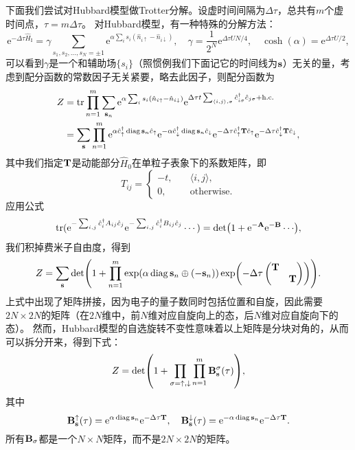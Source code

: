 \documentclass[hyperref, UTF8, a4paper]{ctexart}
\DeclareMathOperator{\diag}{diag}
\newcommand*{\ee}{\mathrm{e}}
\newcommand*{\pair}[1]{\langle #1 \rangle}
\begin{document}
下面我们尝试对Hubbard模型做Trotter分解。设虚时间间隔为$\Delta\tau$，总共有$m$个虚时间点，$\tau=m\Delta \tau$。
对Hubbard模型，有一种特殊的分解方法：
\begin{equation}
    \ee^{-\Delta \tau \hat{H}_\text{I}} = \gamma \sum_{s_1, s_2, \ldots, s_N = \pm 1} \ee^{\alpha \sum_i s_i (\hat{n}_{i\uparrow} - \hat{n}_{i \downarrow})}, 
    \quad \gamma = \frac{1}{2^N} \ee^{\Delta \tau U N / 4}, \quad \cosh(\alpha) = \ee^{\Delta \tau U / 2},
\end{equation}
可以看到$\gamma$是一个和辅助场$\{s_i\}$（照惯例我们下面记它的时间线为$\vb{s}$）无关的量，考虑到配分函数的常数因子无关紧要，略去此因子，则配分函数为
\[
    \begin{aligned}
        Z &= \trace \prod_{n=1}^m \sum_{\vb{s}_{n}} \ee^{\alpha \sum_i s_i (\hat{n}_{i\uparrow} - \hat{n}_{i \downarrow})} \ee^{\Delta \tau t \sum_{\pair{i, j}, \sigma} \hat{c}_{i\sigma}^\dagger \hat{c}_{j\sigma} + \text{h.c.}} \\
        &= \sum_{\vb{s}} \prod_{n=1}^m \ee^{\alpha \hat{c}^\dagger_{\uparrow} \diag{\vb{s}_n} \hat{c}_{\uparrow}} \ee^{- \alpha \hat{c}^\dagger_{\downarrow} \diag{\vb{s}_n} \hat{c}_{\downarrow}} \ee^{- \Delta \tau \hat{c}_\uparrow^\dagger \vb{T} \hat{c}_\uparrow} \ee^{- \Delta \tau \hat{c}_\downarrow^\dagger \vb{T} \hat{c}_\downarrow},
    \end{aligned}
\]
其中我们指定$\vb{T}$是动能部分$\hat{H}_0$在单粒子表象下的系数矩阵，即
\begin{equation}
    T_{ij} = \begin{cases}
        -t, \quad &\pair{i, j}, \\
        0, \quad &\text{otherwise}.
    \end{cases}
\end{equation}
应用公式
\begin{equation}
    \trace(\ee^{- \sum_{i, j} \hat{c}_i^\dagger A_{ij} \hat{c}_j} \ee^{- \sum_{i, j} \hat{c}_i^\dagger B_{ij} \hat{c}_j} \cdots) = \det(1 + \ee^{- \vb{A}}\ee^{- \vb{B}} \cdots),
    \label{eq:trace-to-det}
\end{equation}
我们积掉费米子自由度，得到
\[
    Z = \sum_{\vb{s}} \det(1 + \prod_{n=1}^m \exp(\alpha \diag{\vb{s}_n \oplus (-\vb{s}_n)}) \exp( -\Delta \tau \pmqty{\dmat{\vb{T}, \vb{T}}})).
\]
上式中出现了矩阵拼接，因为电子的量子数同时包括位置和自旋，因此需要$2N \times 2N$的矩阵（在$2N$维中，前$N$维对应自旋向上的态，后$N$维对应自旋向下的态）。
然而，Hubbard模型的自选旋转不变性意味着以上矩阵是分块对角的，从而可以拆分开来，得到下式：
\begin{equation}
    Z = \det(1 + \prod_{\sigma=\uparrow, \downarrow} \prod_{n=1}^m \vb{B}_{\vb{s}}^\sigma(\tau) ),
\end{equation}
其中
\begin{equation}
    \vb{B}^\uparrow_{\vb{s}}(\tau) = \ee^{\alpha \diag \vb{s}_n} \ee^{-\Delta \tau \vb{T}}, \quad \vb{B}^\downarrow_{\vb{s}}(\tau) = \ee^{- \alpha \diag \vb{s}_n} \ee^{-\Delta \tau \vb{T}}.
\end{equation}
所有$\vb{B}_{\sigma}$都是一个$N \times N$矩阵，而不是$2N \times 2N$的矩阵。
\end{document}
